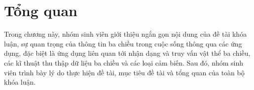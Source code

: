 

\chapter{Tổng quan}
\label{chap-intro}
\begin{ChapAbstract}
Trong chương này, nhóm sinh viên giới thiệu ngắn gọn nội dung của đề tài khóa luận, sự quan trọng của thông tin ba chiều trong cuộc sống thông qua các ứng dụng, đặc biệt là ứng dụng liên quan tới nhận dạng và truy vấn vật thể ba chiều, các kĩ thuật thu thập dữ liệu ba chiều và các loại cảm biến. Sau đó, nhóm sinh viên trình bày lý do thực hiện đề tài, mục tiêu đề tài và tổng quan của toàn bộ khóa luận.
\end{ChapAbstract}


